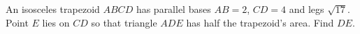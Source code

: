 An isosceles trapezoid $ABCD$ has parallel bases $AB=2$, $CD=4$ and legs $\sqrt{17}$. Point $E$ lies on $CD$ so that triangle $ADE$ has half the trapezoid's area. Find $DE$.
